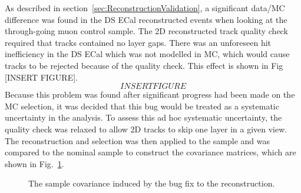 \newline
\newline
As described in section~\ref{sec:ReconstructionValidation}, a significant data/MC difference was found in the DS ECal reconstructed events when looking at the through-going muon control sample.  The 2D reconstructed track quality check required that tracks contained no layer gaps.  There was an unforeseen hit inefficiency in the DS ECal which was not modelled in MC, which would cause tracks to be rejected because of the quality check.  This effect is shown in Fig [INSERT FIGURE].
\begin{equation}
INSERT FIGURE
\end{equation}
Because this problem was found after significant progress had been made on the MC selection, it was decided that this bug would be treated as a systematic uncertainty in the analysis.  To assess this ad hoc systematic uncertainty, the quality check was relaxed to allow 2D tracks to skip one layer in a given view.  The reconstruction and selection was then applied to the sample and was compared to the nominal sample to construct the covariance matrices, which are shown in Fig.~\ref{fig:ECalHoughBugCovarianceMatrices}.
\begin{figure}[b!]
  \centering
  \caption{The sample covariance induced by the bug fix to the reconstruction.}
  \label{fig:ECalHoughBugCovarianceMatrices}
\end{figure}
